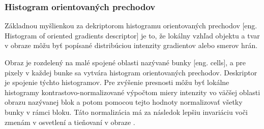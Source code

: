 \subsubsection{Histogram orientovaných prechodov}
Základnou myšlienkou za dekriptorom histogramu orientovaných prechodov [eng. Histogram of oriented gradients descriptor] je to, že lokálny vzhľad objektu a tvar v obraze môžu byť popísané
	distribúciou intenzity gradientov alebo smerov hrán.

Obraz je rozdelený na malé spojené oblasti nazývané bunky [eng. cells], a pre pixely v každej bunke sa vytvára histogram orientovaných prechodov.
Deskriptor je spojenie týchto histogramov.
Pre zvýšenie presnosti môžu byť lokálne histogramy kontrastovo-normalizované výpočtom miery intenzity vo väčšej oblasti obrazu nazývanej blok a potom
	pomocou tejto hodnoty normalizovať všetky bunky v rámci bloku.
Táto normalizácia má za následok lepšiu invariáciu voči zmenám v osvetlení a tieňovaní v obraze \cite{prop:HOG}.

\begin{comment}
	\subsubsection{Priemerna štandartná odchýlka vstupných údajov}
	Je užitočné vytvoriť si tzv. ``stredný obraz'' získaný priemernými hodnotami pre každý pixel zo všetkých trénovacích dát.
	Timto spôsobom je možné vytvoriť si základný prehľad o štruktúre vstupných dát.
	Na základe toho môžeme potom do vstupným dát pridať rôzne dalšie variácie klasifikovaných objektov pre lepšie generalizovanie klasifikátora \cite{odkaz:NNPreprocessing}.
\end{comment}
